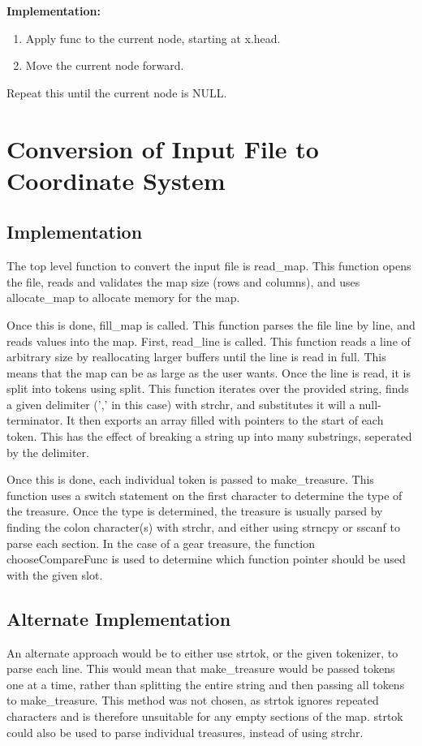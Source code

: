 \documentclass{article}
\begin{document}
 
 \textbf{Implementation:}
 \begin{enumerate}
\item Apply  func to the current node, starting at  x.head.
\item Move the current node forward.
\end{enumerate}
Repeat this until the current node is NULL.
 

\section{Conversion of Input File to Coordinate System}
\subsection{Implementation}
The top level function to convert the input file is read\_map.
This function opens the file, reads and validates the map size (rows and columns),
and uses allocate\_map to allocate memory for the map.

Once this is done, fill\_map is called.
This function parses the file line by line, and reads values into the map.
First, read\_line is called. This function reads a line of arbitrary size
by reallocating larger buffers until the line is read in full. This means that
the map can be as large as the user wants.
Once the line is read, it is split into tokens using split. This function iterates
over the provided string, finds a given delimiter (',' in this case) with strchr, and substitutes
it will a null-terminator. It then exports an array filled with pointers to the start
of each token. This has the effect of breaking a string up into many substrings, seperated
by the delimiter.

Once this is done, each individual token is passed to make\_treasure. This function
uses a switch statement on the first character to determine the type of the treasure.
Once the type is determined, the treasure is usually parsed by finding the colon character(s)
with strchr, and either using strncpy or sscanf to parse each section.
In the case of a gear treasure,
the function chooseCompareFunc is used to determine which function pointer should be used
with the given slot.

\subsection{Alternate Implementation}

An alternate approach would be to either use strtok, or the given tokenizer, to parse each line.
This would mean that make\_treasure would be passed tokens one at a time, rather than splitting the entire
string and then passing all tokens to make\_treasure. This method was not chosen, as strtok ignores repeated
characters and is therefore unsuitable for any empty sections of the map. strtok could also be used to parse
individual treasures, instead of using strchr.
\end{document}

